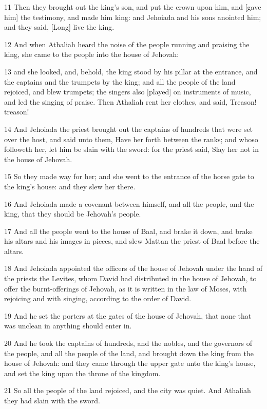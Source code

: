 \par 11 Then they brought out the king's son, and put the crown upon him, and [gave him] the testimony, and made him king: and Jehoiada and his sons anointed him; and they said, [Long] live the king.
\par 12 And when Athaliah heard the noise of the people running and praising the king, she came to the people into the house of Jehovah:
\par 13 and she looked, and, behold, the king stood by his pillar at the entrance, and the captains and the trumpets by the king; and all the people of the land rejoiced, and blew trumpets; the singers also [played] on instruments of music, and led the singing of praise. Then Athaliah rent her clothes, and said, Treason! treason!
\par 14 And Jehoiada the priest brought out the captains of hundreds that were set over the host, and said unto them, Have her forth between the ranks; and whoso followeth her, let him be slain with the sword: for the priest said, Slay her not in the house of Jehovah.
\par 15 So they made way for her; and she went to the entrance of the horse gate to the king's house: and they slew her there.
\par 16 And Jehoiada made a covenant between himself, and all the people, and the king, that they should be Jehovah's people.
\par 17 And all the people went to the house of Baal, and brake it down, and brake his altars and his images in pieces, and slew Mattan the priest of Baal before the altars.
\par 18 And Jehoiada appointed the officers of the house of Jehovah under the hand of the priests the Levites, whom David had distributed in the house of Jehovah, to offer the burnt-offerings of Jehovah, as it is written in the law of Moses, with rejoicing and with singing, according to the order of David.
\par 19 And he set the porters at the gates of the house of Jehovah, that none that was unclean in anything should enter in.
\par 20 And he took the captains of hundreds, and the nobles, and the governors of the people, and all the people of the land, and brought down the king from the house of Jehovah: and they came through the upper gate unto the king's house, and set the king upon the throne of the kingdom.
\par 21 So all the people of the land rejoiced, and the city was quiet. And Athaliah they had slain with the sword.

